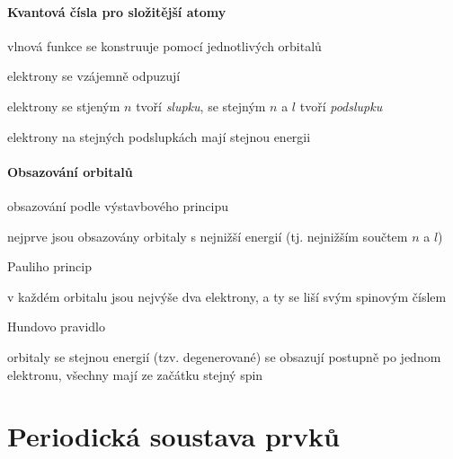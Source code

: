 \documentclass[DIV=8]{scrreprt}
\begin{document}
\paragraph{Kvantová čísla pro složitější atomy}
\begin{myItemize}[nosep]
    \item vlnová funkce se konstruuje pomocí jednotlivých orbitalů
    \item elektrony se vzájemně odpuzují
    \item elektrony se stjeným \(n\) tvoří \emph{slupku}, se stejným \(n\) a \(l\) tvoří \emph{podslupku}
\begin{myItemize}[nosep]
    \item elektrony na stejných podslupkách mají stejnou energii
\end{myItemize}

\end{myItemize}



\paragraph{Obsazování orbitalů}
\begin{myItemize}[nosep]
    \item obsazování podle výstavbového principu
\begin{myItemize}[nosep]
    \item nejprve jsou obsazovány orbitaly s nejnižší energií (tj. nejnižším součtem \(n\) a \(l\))
\end{myItemize}

    \item Pauliho princip
\begin{myItemize}[nosep]
    \item v každém orbitalu jsou nejvýše dva elektrony, a ty se liší svým spinovým číslem
\end{myItemize}

    \item Hundovo pravidlo
\begin{myItemize}[nosep]
    \item orbitaly se stejnou energií (tzv. degenerované) se obsazují postupně po jednom elektronu, všechny mají ze začátku stejný spin
\end{myItemize}

\end{myItemize}



\section{Periodická soustava prvků} \label{Periodická soustava prvků} \FloatBarrier
\end{document}
